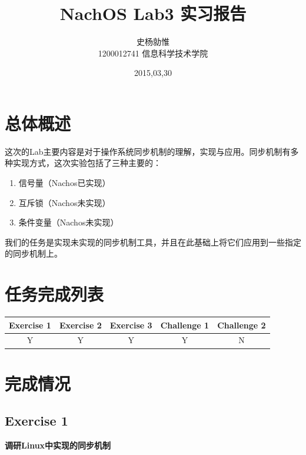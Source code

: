 \documentclass{ctexart}
\begin{document}
\title{%
\vspace{-30mm}\heiti\Huge NachOS Lab3 实习报告 \vspace{10mm}}
\author{%
\Large 史杨勍惟 
\\[10mm] 1200012741 信息科学技术学院}
\date{2015,03,30}

\maketitle

\newpage
\tableofcontents
\newpage

\section{总体概述}
这次的Lab主要内容是对于操作系统同步机制的理解，实现与应用。同步机制有多种实现方式，这次实验包括了三种主要的：
\begin{enumerate}
\item 信号量（Nachos已实现）
\item 互斥锁（Nachos未实现）
\item 条件变量（Nachos未实现）
\end{enumerate}
我们的任务是实现未实现的同步机制工具，并且在此基础上将它们应用到一些指定的同步机制上。

\section{任务完成列表}
\begin{table}[h]
\footnotesize
\begin{tabular}{|c|c|c|c|c|}\hline
\textbf{Exercise 1} & \textbf{Exercise 2} & \textbf{Exercise 3} & \textbf{Challenge 1} & \textbf{Challenge 2}\\\hline
Y & Y & Y & Y & N\\\hline

\end{tabular}

\end{table}
\section{完成情况}
\subsection*{Exercise 1}
\textbf{调研Linux中实现的同步机制}
\end{document}
